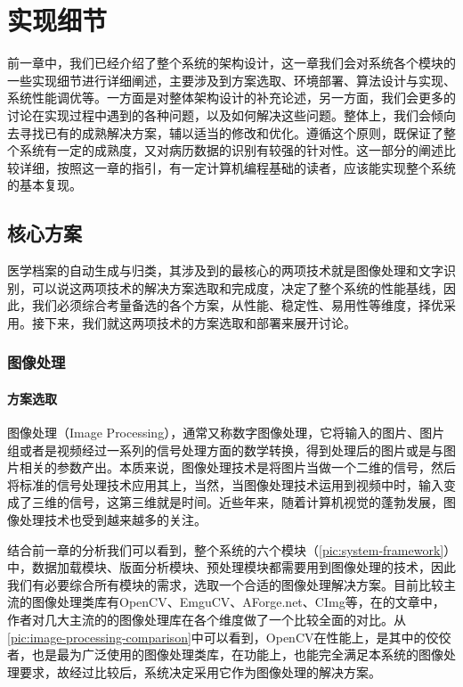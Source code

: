 \chapter{实现细节}
\label{chap:implements}
前一章中，我们已经介绍了整个系统的架构设计，这一章我们会对系统各个模块的一些实现细节进行详细阐述，主要涉及到方案选取、环境部署、算法设计与实现、系统性能调优等。一方面是对整体架构设计的补充论述，另一方面，我们会更多的讨论在实现过程中遇到的各种问题，以及如何解决这些问题。整体上，我们会倾向去寻找已有的成熟解决方案，辅以适当的修改和优化。遵循这个原则，既保证了整个系统有一定的成熟度，又对病历数据的识别有较强的针对性。这一部分的阐述比较详细，按照这一章的指引，有一定计算机编程基础的读者，应该能实现整个系统的基本复现。

\section{核心方案}
医学档案的自动生成与归类，其涉及到的最核心的两项技术就是图像处理和文字识别，可以说这两项技术的解决方案选取和完成度，决定了整个系统的性能基线，因此，我们必须综合考量备选的各个方案，从性能、稳定性、易用性等维度，择优采用。接下来，我们就这两项技术的方案选取和部署来展开讨论。

\subsection{图像处理}
\subsubsection*{方案选取}
图像处理（Image Processing），通常又称数字图像处理，它将输入的图片、图片组或者是视频经过一系列的信号处理方面的数学转换，得到处理后的图片或是与图片相关的参数产出\citep{gonzalez2008digital}。本质来说，图像处理技术是将图片当做一个二维的信号，然后将标准的信号处理技术应用其上，当然，当图像处理技术运用到视频中时，输入变成了三维的信号，这第三维就是时间。近些年来，随着计算机视觉的蓬勃发展，图像处理技术也受到越来越多的关注。

结合前一章的分析我们可以看到，整个系统的六个模块（\autoref{pic:system-framework}）中，数据加载模块、版面分析模块、预处理模块都需要用到图像处理的技术，因此我们有必要综合所有模块的需求，选取一个合适的图像处理解决方案。目前比较主流的图像处理类库有OpenCV\citep{bradski2008OpenCV}、EmguCV\citep{Shi013emgu}、AForge.net\citep{Kirillov2013Aforge}、CImg\citep{tschumperle2012cimg}等，在\citep{XianrongWang}的文章中，作者对几大主流的的图像处理库在各个维度做了一个比较全面的对比。从\autoref{pic:image-processing-comparison}中可以看到，OpenCV在性能上，是其中的佼佼者，也是最为广泛使用的图像处理类库，在功能上，也能完全满足本系统的图像处理要求，故经过比较后，系统决定采用它作为图像处理的解决方案。

